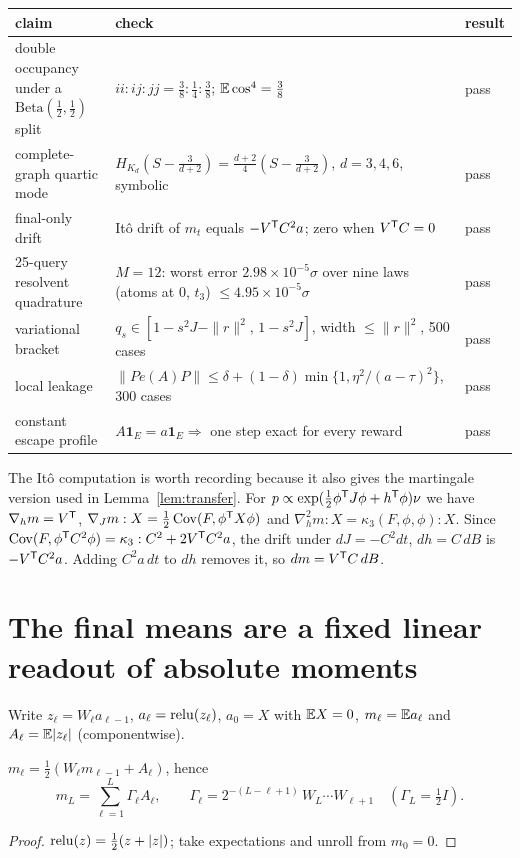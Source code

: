 \begin{center}\footnotesize
\begin{tabular}{@{}p{4.4cm}p{8.8cm}l@{}}\toprule
claim & check & result\\\midrule
double occupancy under a $\mathrm{Beta}(\frac12,\frac12)$ split & $ii:ij:jj=\frac38:\frac14:\frac38$; $\mathbb{E}\cos^4=\frac38$ & pass\\
complete-graph quartic mode & $H_{K_d}(S-\frac3{d+2})=\frac{d+2}4(S-\frac3{d+2})$, $d=3,4,6$, symbolic & pass\\
final-only drift & It\^o drift of $m_t$ equals $-V^{\mathsf T} C^2a$; zero when $V^{\mathsf T} C=0$ & pass\\
25-query resolvent quadrature & $M=12$: worst error $2.98\times10^{-5}\sigma$ over nine laws (atoms at $0$, $t_3$) $\le4.95\times10^{-5}\sigma$ & pass\\
variational bracket & $q_s\in[1-s^2J-\|r\|^2,\,1-s^2J]$, width $\le\|r\|^2$, 500 cases & pass\\
local leakage & $\|Pe(A)P\|\le\delta+(1-\delta)\min\{1,\eta^2/(a-\tau)^2\}$, 300 cases & pass\\
constant escape profile & $A\mathbf 1_E=a\mathbf 1_E\Rightarrow$ one step exact for every reward & pass\\\bottomrule
\end{tabular}
\end{center}

The It\^o computation is worth recording because it also gives the martingale version used in
Lemma~\ref{lem:transfer}. For $p\propto\exp(\frac12\phi^{\mathsf T} J\phi+h^{\mathsf T}\phi)\nu$ we have $\nabla_hm=V^{\mathsf T}$,
$\nabla_Jm:X=\frac12\operatorname{Cov}(F,\phi^{\mathsf T} X\phi)$ and $\nabla_h^2m:X=\kappa_3(F,\phi,\phi):X$. Since
$\operatorname{Cov}(F,\phi^{\mathsf T} C^2\phi)=\kappa_3:C^2+2V^{\mathsf T} C^2a$, the drift under $dJ=-C^2dt$, $dh=C\,dB$ is $-V^{\mathsf T} C^2a$. Adding $C^2a\,dt$
to $dh$ removes it, so $dm=V^{\mathsf T} C\,dB$.

\section{The final means are a fixed linear readout of absolute moments}

Write $z_\ell=W_\ell a_{\ell-1}$, $a_\ell=\operatorname{relu}(z_\ell)$, $a_0=X$ with $\mathbb{E} X=0$, $m_\ell=\mathbb{E} a_\ell$ and
$A_\ell=\mathbb{E}|z_\ell|$ (componentwise).

\begin{theorem}\label{thm:ungated}
$m_\ell=\frac12(W_\ell m_{\ell-1}+A_\ell)$, hence
\[
m_L=\sum_{\ell=1}^L\Gamma_\ell A_\ell,\qquad \Gamma_\ell=2^{-(L-\ell+1)}\,W_L\cdots W_{\ell+1}\quad(\Gamma_L=\tfrac12I).
\]
\end{theorem}
\begin{proof}
$\operatorname{relu}(z)=\frac12(z+|z|)$; take expectations and unroll from $m_0=0$.
\end{proof}

